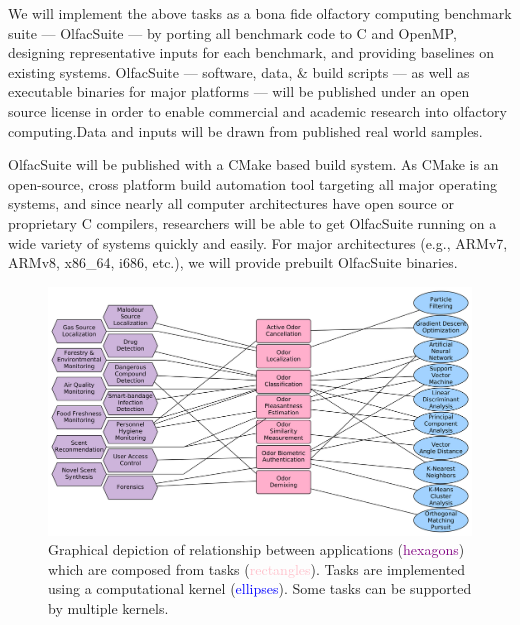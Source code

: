 
 
We will implement the above tasks as a bona fide olfactory computing benchmark suite --- OlfacSuite --- by
    porting all benchmark code to C and OpenMP, designing representative inputs
    for each benchmark, and providing baselines on existing systems. OlfacSuite --- software, data, \& build scripts --- as well as
    executable binaries for major platforms --- will be published under
    an open source license in order to enable commercial and academic
    research into olfactory computing.Data and inputs will be drawn from published real
    world samples.
    
    OlfacSuite will be published with a CMake based build system.  As CMake
    is an open-source, cross platform build automation tool targeting all
    major operating systems, and since nearly all computer architectures
    have open source or proprietary C compilers, researchers will be able
    to get OlfacSuite running on a wide variety of systems quickly and easily.
    For major architectures (e.g., ARMv7, ARMv8, x86\_64, i686, etc.),
    we will provide prebuilt OlfacSuite binaries.



\begin{figure}
    \includegraphics[width=\linewidth]{app_task_kernel.png}
    \caption{
        \small Graphical depiction of relationship between applications
        (\textcolor{purple}{hexagons}) which are composed from tasks
        (\textcolor{pink}{rectangles}).  Tasks are implemented using a
        computational kernel (\textcolor{blue}{ellipses}). Some tasks can be
        supported by multiple kernels.
    }
    \label{fig:app_task_kernel}
\end{figure}

